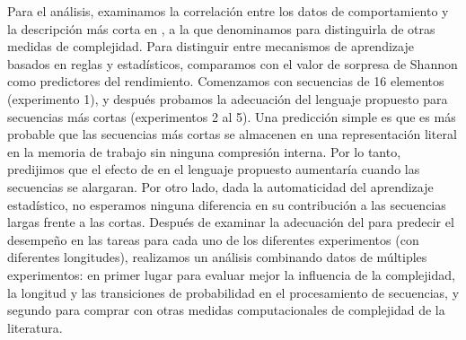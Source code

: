 
Para el análisis, examinamos la correlación entre los datos de comportamiento y la descripción más corta en \grambin, a la que denominamos \mdlbin para distinguirla de otras medidas de complejidad. Para distinguir entre mecanismos de aprendizaje basados en reglas y estadísticos, comparamos \mdlbin con el valor de sorpresa de Shannon como predictores del rendimiento. Comenzamos con secuencias de 16 elementos (experimento 1), y después probamos la adecuación del lenguaje propuesto para secuencias más cortas (experimentos 2 al 5). Una predicción simple es que es más probable que las secuencias más cortas se almacenen en una representación literal en la memoria de trabajo sin ninguna compresión interna. Por lo tanto, predijimos que el efecto de \mdlbin en el lenguaje propuesto aumentaría cuando las secuencias se alargaran. Por otro lado, dada la automaticidad del aprendizaje estadístico, no esperamos ninguna diferencia en su contribución a las secuencias largas frente a las cortas. Después de examinar la adecuación del \lot para predecir el desempeño en las tareas para cada uno de los diferentes experimentos (con diferentes longitudes), realizamos un análisis combinando datos de múltiples experimentos: en primer lugar para evaluar mejor la influencia de la complejidad, la longitud y las transiciones de probabilidad en el procesamiento de secuencias, y segundo para comprar \mdlbin con otras medidas computacionales de complejidad de la literatura. 

